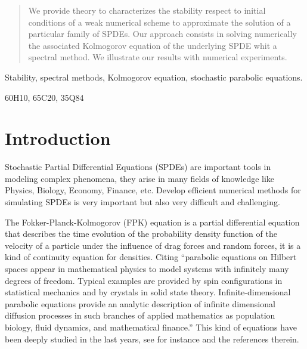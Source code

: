 \documentclass[review,onefignum,onetabnum]{siamart190516}
\begin{document}
    \maketitle
%
    \begin{abstract}
        We provide theory to characterizes the stability respect to initial 
        conditions of a weak numerical scheme to approximate the solution of a
        particular family of SPDEs. Our approach consists in solving 
        numerically the associated Kolmogorov equation of the underlying SPDE 
        whit a spectral method. We illustrate our results with numerical
        experiments.
    \end{abstract}
%
    \begin{keywords}
        Stability, spectral methods, Kolmogorov equation,
        stochastic parabolic equations.
    \end{keywords}
%
    \begin{AMS}
        60H10, 65C20, 35Q84
    \end{AMS}
%
\section{Introduction}
        Stochastic Partial Differential Equations (SPDEs) are important tools in
    modeling complex phenomena, they arise in many fields of knowledge like
    Physics, Biology, Economy, Finance, etc. Develop efficient numerical
    methods for simulating SPDEs is very important but also very difficult and
    challenging.
    
        The  Fokker-Planck-Kolmogorov (FPK) equation is a partial differential
    equation that describes the time evolution of the probability density 
    function of the velocity of a particle under the influence of drag forces 
    and random forces, it is a kind of continuity equation for densities. 
    Citing \cite{da-za}
    ``parabolic equations on Hilbert spaces appear in mathematical physics to 
    model systems with infinitely many degrees of freedom. Typical examples are 
    provided by spin configurations in statistical mechanics and by crystals in 
    solid state theory. Infinite-dimensional parabolic equations provide an 
    analytic description of infinite dimensional diffusion processes in such 
    branches of applied mathematics as population biology, fluid dynamics, and 
    mathematical finance.'' This kind of equations have been deeply studied in 
    the last years, see for instance \cite{bo-da-ro, da-fl-ro, da} and the 
    references therein.
    
\end{document}
